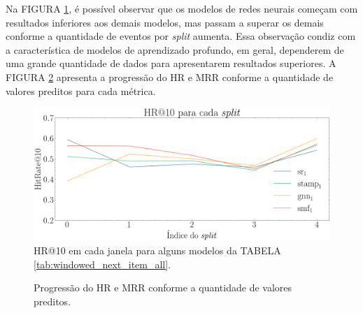 Na FIGURA
\ref{fig:next-item-single-123}, é possível observar que os modelos de redes neurais
começam com resultados inferiores aos demais modelos, mas passam a superar os
demais conforme a quantidade de eventos por \textit{split} aumenta. Essa
observação condiz com a característica de modelos de aprendizado profundo, em
geral, dependerem de uma grande quantidade de dados para apresentarem resultados
superiores. A FIGURA \ref{fig:progressao} apresenta a progressão do HR e MRR conforme a
quantidade de valores preditos para cada métrica.


\begin{figure}[htbp]
  \centering
  \includegraphics[width=1\textwidth]{chapters/chap04/images/hr10_splits.png}
  \caption{HR@10 em cada janela para alguns modelos da TABELA
  \ref{tab:windowed_next_item_all}.}
  \label{fig:next-item-single-123}
\end{figure}


\begin{figure}[htbp]
  \hfill
  \hfill
  \hfill
  \caption{Progressão do HR e MRR conforme a quantidade de valores preditos.}
  \label{fig:progressao}
  \end{figure}

